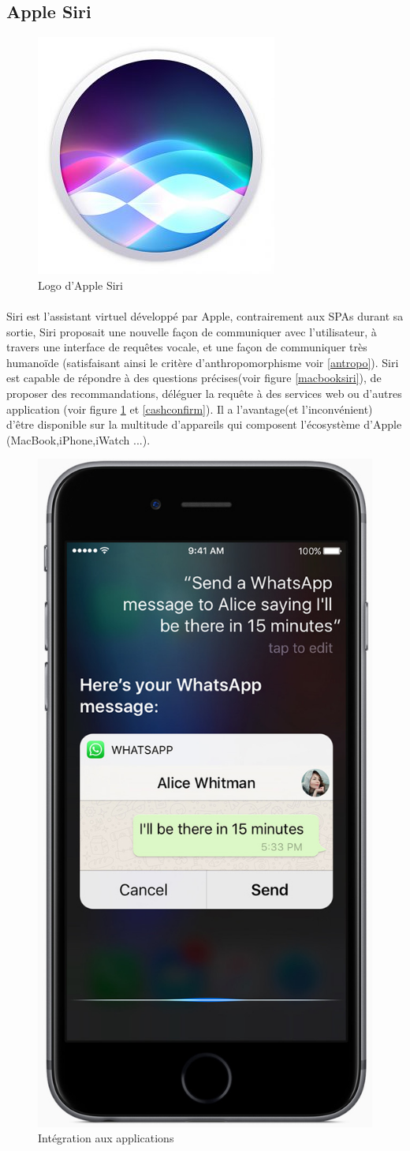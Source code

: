 \subsection*{Apple Siri}\label{siri}
\begin{figure}[H]
	\centering
	\includegraphics[width=.25\linewidth]{images/apple_siri/logo.png}
	\caption{Logo d'Apple Siri} 
\end{figure}
\paragraph{}
Siri est l'assistant virtuel développé par Apple, contrairement aux SPAs durant sa sortie, Siri proposait une nouvelle façon de communiquer avec l'utilisateur, à travers une interface de requêtes vocale, et une façon de communiquer très humanoïde (satisfaisant ainsi le critère d'anthropomorphisme voir \ref{antropo}).
Siri est capable de répondre à des questions précises(voir figure \ref{macbooksiri}), de proposer des recommandations, déléguer la requête à des services web ou d'autres application (voir figure \ref{whatsapp} et \ref{cashconfirm}). Il a l'avantage(et l'inconvénient) d'être disponible sur la multitude d'appareils qui composent l'écosystème d'Apple (MacBook,iPhone,iWatch ...).

\begin{figure}[H] 
		\centering
		\includegraphics[width=.25\linewidth]{images/apple_siri/whatsapp.jpg} 
		\caption{Intégration aux applications \cite{siriDemo}}
		\label{whatsapp}
\end{figure}

